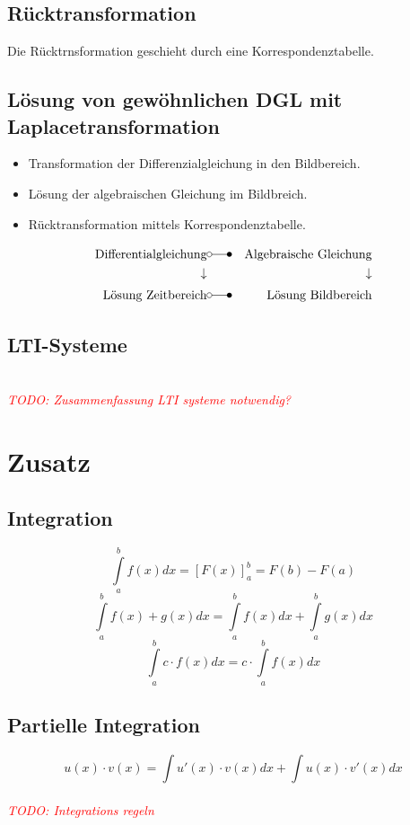\documentclass[12pt]{article}
\newcommand\todo[1]{\textit{\textcolor{red}{\\TODO: #1}}}
\begin{document}
\subsection{Rücktransformation}
Die Rücktrnsformation geschieht durch eine Korrespondenztabelle.
\subsection{Lösung von gewöhnlichen DGL mit Laplacetransformation}
\begin{itemize}
	\item Transformation der Differenzialgleichung in den Bildbereich.
	\item Lösung der algebraischen Gleichung im Bildbreich.
	\item Rücktransformation mittels Korrespondenztabelle.
\end{itemize}
\begin{eqnarray*}
	\text{Differentialgleichung} & \laplace & \text{Algebraische Gleichung}\\
	\downarrow & & \downarrow \\
	\text{Lösung Zeitbereich} & \laplace & \text{Lösung Bildbereich}
\end{eqnarray*}
\subsection{LTI-Systeme}
\todo{Zusammenfassung LTI systeme notwendig?}
\section{Zusatz}
\subsection{Integration}
\begin{equation*}
	\int\limits_{a}^{b}f(x) dx = [F(x)]_a^b = F(b) - F(a)
\end{equation*}
\begin{equation*}
	\int\limits_{a}^{b}f(x) + g(x) dx = \int\limits_{a}^{b}f(x) dx + \int\limits_{a}^{b}g(x) dx
\end{equation*}
\begin{equation*}
	\int\limits_{a}^{b}c\cdot f(x) dx = c\cdot \int\limits_{a}^{b}f(x) dx
\end{equation*}
\subsection{Partielle Integration}
\begin{equation*}
	u(x)\cdot v(x) = \int u'(x) \cdot v(x) dx + \int u(x) \cdot v'(x) dx
\end{equation*}
\todo{Integrations regeln}
\end{document}
